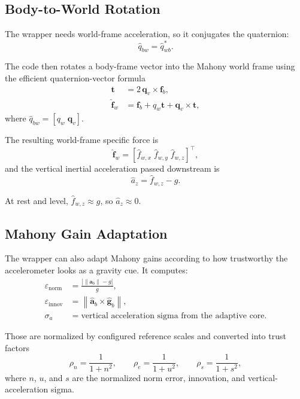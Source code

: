 \documentclass[conference]{IEEEtran}
\newcommand{\vct}[1]{\bm{#1}}
\begin{document}
\subsection{Body-to-World Rotation}

The wrapper needs world-frame acceleration, so it conjugates the quaternion:
\begin{equation}
\hat{q}_{bw} = \hat{q}_{wb}^{\ast}.
\end{equation}

The code then rotates a body-frame vector into the Mahony world frame using
the efficient quaternion-vector formula
\begin{align}
\vct{t} &= 2\,\vct{q}_v \times \vct{f}_b,\\
\hat{\vct{f}}_w &= \vct{f}_b + q_w\vct{t} + \vct{q}_v \times \vct{t},
\end{align}
where \(\hat{q}_{bw}=[q_w\;\vct{q}_v]\).

The resulting world-frame specific force is
\begin{equation}
\hat{\vct{f}}_w = [\hat{f}_{w,x}\;\hat{f}_{w,y}\;\hat{f}_{w,z}]^\top,
\end{equation}
and the vertical inertial acceleration passed downstream is
\begin{equation}
\hat{a}_z = \hat{f}_{w,z} - g.
\end{equation}

At rest and level, \(\hat{f}_{w,z}\approx g\), so \(\hat{a}_z \approx 0\).

\subsection{Mahony Gain Adaptation}

The wrapper can also adapt Mahony gains according to how trustworthy the
accelerometer looks as a gravity cue. It computes:
\begin{align}
\varepsilon_{\mathrm{norm}} &=
\frac{\left|\|\vct{a}_b\| - g\right|}{g},\\
\varepsilon_{\mathrm{innov}} &=
\left\|\hat{\vct{a}}_b \times \hat{\vct{g}}_b\right\|,\\
\sigma_a &= \text{vertical acceleration sigma from the adaptive core}.
\end{align}

Those are normalized by configured reference scales and converted into trust
factors
\begin{equation}
\rho_n = \frac{1}{1+n^2},\qquad
\rho_e = \frac{1}{1+u^2},\qquad
\rho_s = \frac{1}{1+s^2},
\end{equation}
where \(n\), \(u\), and \(s\) are the normalized norm error, innovation,
and vertical-acceleration sigma.
\end{document}
